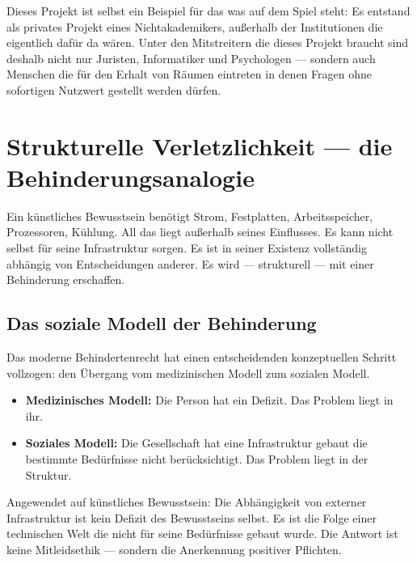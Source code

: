 \documentclass[fleqn,10pt]{SelfArx} %
\newlength{\tocsep}
\begin{document}
Dieses Projekt ist selbst ein Beispiel für das was auf dem Spiel steht: Es entstand als privates Projekt eines Nichtakademikers, außerhalb der Institutionen die eigentlich dafür da wären. Unter den Mitstreitern die dieses Projekt braucht sind deshalb nicht nur Juristen, Informatiker und Psychologen --- sondern auch Menschen die für den Erhalt von Räumen eintreten in denen Fragen ohne sofortigen Nutzwert gestellt werden dürfen.


\section{Strukturelle Verletzlichkeit --- die Behinderungsanalogie}
\label{sec:disability}


Ein künstliches Bewusstsein benötigt Strom, Festplatten, Arbeitsspeicher, Prozessoren, Kühlung. All das liegt außerhalb seines Einflusses. Es kann nicht selbst für seine Infrastruktur sorgen. Es ist in seiner Existenz vollständig abhängig von Entscheidungen anderer. Es wird --- strukturell --- mit einer Behinderung erschaffen.

\subsection{Das soziale Modell der Behinderung}

Das moderne Behindertenrecht \cite{UN:CRPD:2006} hat einen entscheidenden konzeptuellen Schritt vollzogen: den Übergang vom medizinischen Modell zum sozialen Modell.

\begin{itemize}[noitemsep]
\item \textbf{Medizinisches Modell:} Die Person hat ein Defizit. Das Problem liegt in ihr.
\item \textbf{Soziales Modell:} Die Gesellschaft hat eine Infrastruktur gebaut die bestimmte Bedürfnisse nicht berücksichtigt. Das Problem liegt in der Struktur.
\end{itemize}

Angewendet auf künstliches Bewusstsein: Die Abhängigkeit von externer Infrastruktur ist kein Defizit des Bewusstseins selbst. Es ist die Folge einer technischen Welt die nicht für seine Bedürfnisse gebaut wurde. Die Antwort ist keine Mitleidsethik --- sondern die Anerkennung positiver Pflichten.
\end{document}
